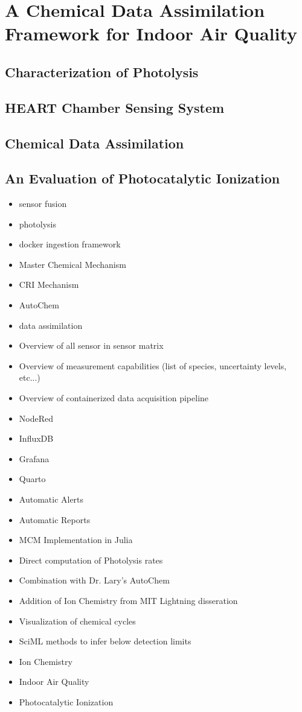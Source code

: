 \chapter{A Chemical Data Assimilation Framework for Indoor Air Quality}

\section{Characterization of Photolysis}
\section{HEART Chamber Sensing System}
\section{Chemical Data Assimilation}
\section{An Evaluation of Photocatalytic Ionization}



\begin{itemize}
\item sensor fusion
\item photolysis
\item docker ingestion framework
\item Master Chemical Mechanism
\item CRI Mechanism
\item AutoChem
\item data assimilation
\item Overview of all sensor in sensor matrix
\item Overview of measurement capabilities (list of species, uncertainty levels, etc...)
\item Overview of containerized data acquisition pipeline
\item NodeRed
\item InfluxDB
\item Grafana
\item Quarto
\item Automatic Alerts
\item Automatic Reports
\item MCM Implementation in Julia
\item Direct computation of Photolysis rates
\item Combination with Dr. Lary's AutoChem
\item Addition of Ion Chemistry from MIT Lightning disseration
\item Visualization of chemical cycles
\item SciML methods to infer below detection limits
\item Ion Chemistry
\item Indoor Air Quality
\item Photocatalytic Ionization
\end{itemize}



